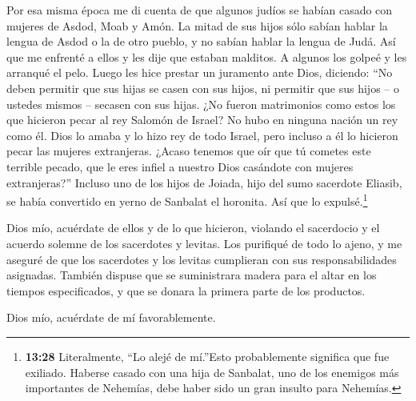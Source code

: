  Por esa misma época me di cuenta de que algunos judíos se
habían casado con mujeres de Asdod, Moab y Amón.  La mitad
de sus hijos sólo sabían hablar la lengua de Asdod o la de otro pueblo,
y no sabían hablar la lengua de Judá.  Así que me enfrenté
a ellos y les dije que estaban malditos. A algunos los golpeé y les
arranqué el pelo. Luego les hice prestar un juramento ante Dios,
diciendo: ``No deben permitir que sus hijas se casen con sus hijos, ni
permitir que sus hijos -- o ustedes mismos -- secasen con sus hijas.
 ¿No fueron matrimonios como estos los que hicieron pecar
al rey Salomón de Israel? No hubo en ninguna nación un rey como él. Dios
lo amaba y lo hizo rey de todo Israel, pero incluso a él lo hicieron
pecar las mujeres extranjeras.  ¿Acaso tenemos que oír que
tú cometes este terrible pecado, que le eres infiel a nuestro Dios
casándote con mujeres extranjeras?''  Incluso uno de los
hijos de Joiada, hijo del sumo sacerdote Eliasib, se había convertido en
yerno de Sanbalat el horonita. Así que lo expulsé.\footnote{\textbf{13:28}
  Literalmente, ``Lo alejé de mí.''Esto probablemente significa que fue
  exiliado. Haberse casado con una hija de Sanbalat, uno de los enemigos
  más importantes de Nehemías, debe haber sido un gran insulto para
  Nehemías.}

 Dios mío, acuérdate de ellos y de lo que hicieron,
violando el sacerdocio y el acuerdo solemne de los sacerdotes y levitas.
 Los purifiqué de todo lo ajeno, y me aseguré de que los
sacerdotes y los levitas cumplieran con sus responsabilidades asignadas.
 También dispuse que se suministrara madera para el altar
en los tiempos especificados, y que se donara la primera parte de los
productos.

Dios mío, acuérdate de mí favorablemente.
